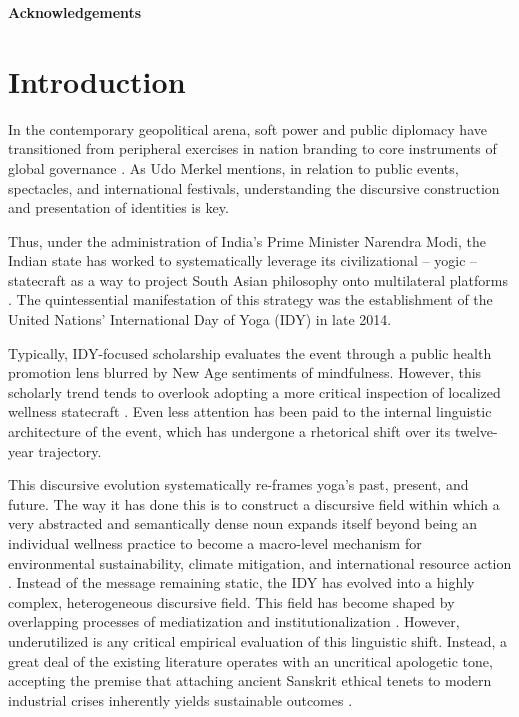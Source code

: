 \documentclass[11pt]{article}
\begin{document}
{\bfseries Acknowledgements}



\newpage

\section{Introduction}

In the contemporary geopolitical arena, soft power and public diplomacy have transitioned from peripheral exercises in nation branding to core instruments of global governance \cite{merkel2015,mokdad2025}. As Udo Merkel mentions, in relation to public events, spectacles, and international festivals, understanding the discursive construction and presentation of identities is key.

Thus, under the administration of India's Prime Minister Narendra Modi, the Indian state has worked to systematically leverage its civilizational – yogic – statecraft as a way to project South Asian philosophy onto multilateral platforms \cite{chandra2026}. The quintessential manifestation of this strategy was the establishment of the United Nations' International Day of Yoga (IDY) in late 2014.

Typically, IDY-focused scholarship evaluates the event through a public health promotion lens blurred by New Age sentiments of mindfulness. However, this scholarly trend tends to overlook adopting a more critical inspection of localized wellness statecraft \cite{otto2025}. Even less attention has been paid to the internal linguistic architecture of the event, which has undergone a rhetorical shift over its twelve-year trajectory.

This discursive evolution systematically re-frames yoga's past, present, and future. The way it has done this is to construct a discursive field within which a very abstracted and semantically dense noun expands itself beyond being an individual wellness practice to become a macro-level mechanism for environmental sustainability, climate mitigation, and international resource action \cite{bhagwat2019}. Instead of the message remaining static, the IDY has evolved into a highly complex, heterogeneous discursive field. This field has become shaped by overlapping processes of mediatization and institutionalization \cite{hjarvard2008}. However, underutilized is any critical empirical evaluation of this linguistic shift. Instead, a great deal of the existing literature operates with an uncritical apologetic tone, accepting the premise that attaching ancient Sanskrit ethical tenets to modern industrial crises inherently yields sustainable outcomes \cite{jagannathan2026}. 
\end{document}
